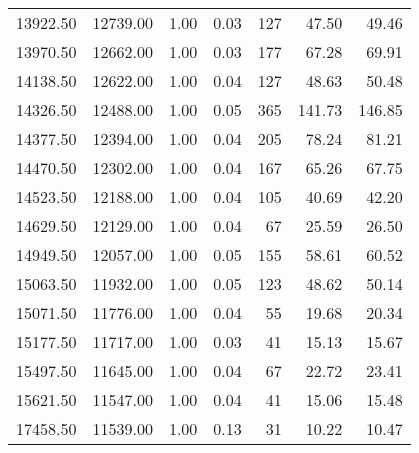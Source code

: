 \begin{table}
\begin{tabular}{rrrrrrr}
13922.50 & 12739.00 & 1.00 & 0.03 & 127 & 47.50 & 49.46 \\
13970.50 & 12662.00 & 1.00 & 0.03 & 177 & 67.28 & 69.91 \\
14138.50 & 12622.00 & 1.00 & 0.04 & 127 & 48.63 & 50.48 \\
14326.50 & 12488.00 & 1.00 & 0.05 & 365 & 141.73 & 146.85 \\
14377.50 & 12394.00 & 1.00 & 0.04 & 205 & 78.24 & 81.21 \\
14470.50 & 12302.00 & 1.00 & 0.04 & 167 & 65.26 & 67.75 \\
14523.50 & 12188.00 & 1.00 & 0.04 & 105 & 40.69 & 42.20 \\
14629.50 & 12129.00 & 1.00 & 0.04 & 67 & 25.59 & 26.50 \\
14949.50 & 12057.00 & 1.00 & 0.05 & 155 & 58.61 & 60.52 \\
15063.50 & 11932.00 & 1.00 & 0.05 & 123 & 48.62 & 50.14 \\
15071.50 & 11776.00 & 1.00 & 0.04 & 55 & 19.68 & 20.34 \\
15177.50 & 11717.00 & 1.00 & 0.03 & 41 & 15.13 & 15.67 \\
15497.50 & 11645.00 & 1.00 & 0.04 & 67 & 22.72 & 23.41 \\
15621.50 & 11547.00 & 1.00 & 0.04 & 41 & 15.06 & 15.48 \\
17458.50 & 11539.00 & 1.00 & 0.13 & 31 & 10.22 & 10.47 \\
\bottomrule
\end{tabular}
\end{table}
